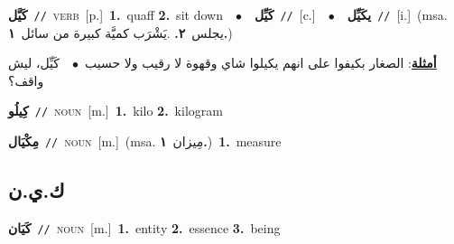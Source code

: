 \documentclass[10pt,a4paper,twoside]{article} %
\begin{document}
\begin{multicols}{2}
{\setlength\topsep{0pt}\textbf{\foreignlanguage{arabic}{كَيَّل}}\ {\color{gray}\texttt{//}\color{black}}\ \textsc{verb}\ [p.]\ \textbf{1.}~quaff  \textbf{2.}~sit down\ \ $\bullet$\ \ \setlength\topsep{0pt}\textbf{\foreignlanguage{arabic}{كَيِّل}}\ {\color{gray}\texttt{//}\color{black}}\ [c.]\ \ $\bullet$\ \ \setlength\topsep{0pt}\textbf{\foreignlanguage{arabic}{يكَيِّل}}\ {\color{gray}\texttt{//}\color{black}}\ [i.]\ \color{gray}(msa. \foreignlanguage{arabic}{يجلس}~\foreignlanguage{arabic}{\textbf{٢.}}  .\foreignlanguage{arabic}{يَشْرَب كميَّة كبيرة من سائل}~\foreignlanguage{arabic}{\textbf{١.}})\color{black}\  \begin{flushright}\color{gray}\foreignlanguage{arabic}{\textbf{\underline{\foreignlanguage{arabic}{أمثلة}}}: الصغار بكيفوا على انهم يكيلوا شاي وقهوة لا رقيب ولا حسيب\ $\bullet$\ \  كَيِّل، ليش واقف؟}\end{flushright}\color{black}} \vspace{2mm}

{\setlength\topsep{0pt}\textbf{\foreignlanguage{arabic}{كِيلُو}}\ {\color{gray}\texttt{//}\color{black}}\ \textsc{noun}\ [m.]\ \textbf{1.}~kilo  \textbf{2.}~kilogram\ } \vspace{2mm}

{\setlength\topsep{0pt}\textbf{\foreignlanguage{arabic}{مِكْيَال}}\ {\color{gray}\texttt{//}\color{black}}\ \textsc{noun}\ [m.]\ \color{gray}(msa. \foreignlanguage{arabic}{مِيزان}~\foreignlanguage{arabic}{\textbf{١.}})\color{black}\ \textbf{1.}~measure\ } \vspace{2mm}

\vspace{-3mm}
\subsection*{\color{blue}\foreignlanguage{arabic}{ك.ي.ن}\color{blue}{}} 

{\setlength\topsep{0pt}\textbf{\foreignlanguage{arabic}{كَيَان}}\ {\color{gray}\texttt{//}\color{black}}\ \textsc{noun}\ [m.]\ \textbf{1.}~entity  \textbf{2.}~essence  \textbf{3.}~being\ } \vspace{2mm}

\end{multicols}
\end{document}
